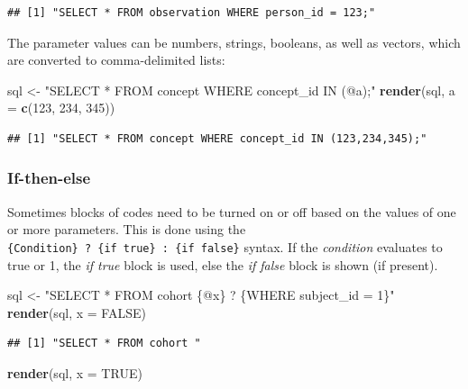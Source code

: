 \documentclass[11pt]{book}
\newenvironment{Shaded}{\begin{snugshade}}{\end{snugshade}}
\newcommand{\DataTypeTok}[1]{\textcolor[rgb]{0.13,0.29,0.53}{#1}}
\newcommand{\DecValTok}[1]{\textcolor[rgb]{0.00,0.00,0.81}{#1}}
\newcommand{\KeywordTok}[1]{\textcolor[rgb]{0.13,0.29,0.53}{\textbf{#1}}}
\newcommand{\NormalTok}[1]{#1}
\newcommand{\OtherTok}[1]{\textcolor[rgb]{0.56,0.35,0.01}{#1}}
\newcommand{\StringTok}[1]{\textcolor[rgb]{0.31,0.60,0.02}{#1}}
\theoremstyle{definition}
\theoremstyle{definition}
\theoremstyle{definition}
\theoremstyle{remark}
\begin{document}
\begin{verbatim}
## [1] "SELECT * FROM observation WHERE person_id = 123;"
\end{verbatim}

The parameter values can be numbers, strings, booleans, as well as vectors, which are converted to comma-delimited lists:

\begin{Shaded}
\begin{Highlighting}[]
\NormalTok{sql <-}\StringTok{ "SELECT * FROM concept WHERE concept_id IN (@a);"}
\KeywordTok{render}\NormalTok{(sql, }\DataTypeTok{a =} \KeywordTok{c}\NormalTok{(}\DecValTok{123}\NormalTok{, }\DecValTok{234}\NormalTok{, }\DecValTok{345}\NormalTok{))}
\end{Highlighting}
\end{Shaded}

\begin{verbatim}
## [1] "SELECT * FROM concept WHERE concept_id IN (123,234,345);"
\end{verbatim}

\hypertarget{if-then-else}{%
\subsubsection*{If-then-else}\label{if-then-else}}

Sometimes blocks of codes need to be turned on or off based on the values of one or more parameters. This is done using the \texttt{\{Condition\}\ ?\ \{if\ true\}\ :\ \{if\ false\}} syntax. If the \emph{condition} evaluates to true or 1, the \emph{if true} block is used, else the \emph{if false} block is shown (if present).

\begin{Shaded}
\begin{Highlighting}[]
\NormalTok{sql <-}\StringTok{ "SELECT * FROM cohort \{@x\} ? \{WHERE subject_id = 1\}"}
\KeywordTok{render}\NormalTok{(sql, }\DataTypeTok{x =} \OtherTok{FALSE}\NormalTok{)}
\end{Highlighting}
\end{Shaded}

\begin{verbatim}
## [1] "SELECT * FROM cohort "
\end{verbatim}

\begin{Shaded}
\begin{Highlighting}[]
\KeywordTok{render}\NormalTok{(sql, }\DataTypeTok{x =} \OtherTok{TRUE}\NormalTok{)}
\end{Highlighting}
\end{Shaded}
\end{document}
